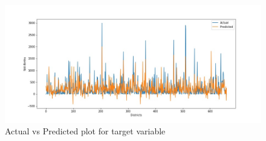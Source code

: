 \documentclass[12pt]{article}
\begin{document}
\begin{figure}[h]
\hspace{-3.2cm}
\includegraphics[scale=.7]{images/RandomForestStillBirth.jpg}
\caption{Actual vs Predicted plot for target variable}
\end{figure}
\end{document}
